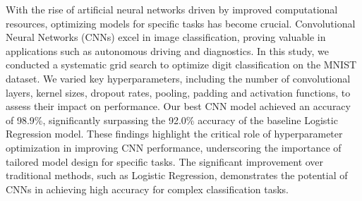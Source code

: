 With the rise of artificial neural networks driven by improved computational resources, optimizing models for specific tasks has become crucial. Convolutional Neural Networks (CNNs) excel in image classification, proving valuable in applications such as autonomous driving and diagnostics. In this study, we conducted a systematic grid search to optimize digit classification on the MNIST dataset. We varied key hyperparameters, including the number of convolutional layers, kernel sizes, dropout rates, pooling, padding and activation functions, to assess their impact on performance. Our best CNN model achieved an accuracy of 98.9\%, significantly surpassing the 92.0\% accuracy of the baseline Logistic Regression model. These findings highlight the critical role of hyperparameter optimization in improving CNN performance, underscoring the importance of tailored model design for specific tasks. The significant improvement over traditional methods, such as Logistic Regression, demonstrates the potential of CNNs in achieving high accuracy for complex classification tasks.
